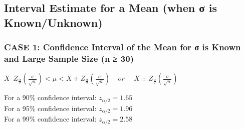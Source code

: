 \documentclass[
  a4paper,
  DIV=11,
  numbers=noendperiod,
  oneside]{scrreprt}
\begin{document}
\hypertarget{interval-estimate-for-a-mean-when-ux3c3-is-knownunknown}{%
\subsection{Interval Estimate for a Mean (when σ is
Known/Unknown)}\label{interval-estimate-for-a-mean-when-ux3c3-is-knownunknown}}

\hypertarget{case-1-confidence-interval-of-the-mean-for-ux3c3-is-known-and-large-sample-size-n-30}{%
\subsubsection{\texorpdfstring{\textbf{CASE 1: Confidence Interval of
the Mean for σ is Known and Large Sample Size (n ≥
30)}}{CASE 1: Confidence Interval of the Mean for σ is Known and Large Sample Size (n ≥ 30)}}\label{case-1-confidence-interval-of-the-mean-for-ux3c3-is-known-and-large-sample-size-n-30}}

\(\bar{X} – Z_{\frac{\alpha}{2}}\left(\frac{\sigma}{\sqrt{n}}\right) \lt \mu \lt \bar{X} + Z_{\frac{\alpha}{2}}\left(\frac{\sigma}{\sqrt{n}}\right)\ \ \ \ \ or\ \ \ \ \ \ \bar{X} \pm Z_{\frac{\alpha}{2}}\left(\frac{\sigma}{\sqrt{n}}\right)\)

\begin{tcolorbox}[enhanced jigsaw, arc=.35mm, bottomtitle=1mm, coltitle=black, colbacktitle=quarto-callout-tip-color!10!white, rightrule=.15mm, colframe=quarto-callout-tip-color-frame, toptitle=1mm, opacityback=0, colback=white, breakable, titlerule=0mm, title=\textcolor{quarto-callout-tip-color}{\faLightbulb}\hspace{0.5em}{Tip}, opacitybacktitle=0.6, leftrule=.75mm, bottomrule=.15mm, toprule=.15mm, left=2mm]

For a 90\% confidence interval: \(z_{α/2}=1.65\)~\\
For a 95\% confidence interval: \(z_{α/2}=1.96\)\\
For a 99\% confidence interval: \(z_{α/2}=2.58\)\\


\end{tcolorbox}
\end{document}
